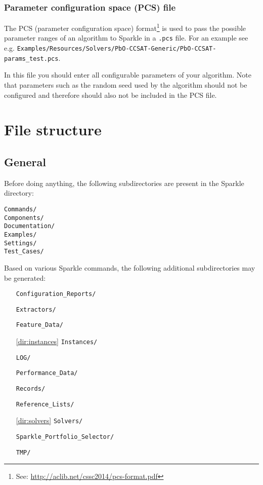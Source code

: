 \documentclass{article}
\begin{document}
\subsubsection{Parameter configuration space (PCS) file}
The PCS (parameter configuration space) format\footnote{See: \url{http://aclib.net/cssc2014/pcs-format.pdf}} is used to pass the possible parameter ranges of an algorithm to Sparkle in a \texttt{.pcs} file. For an example see e.g. \texttt{Examples/Resources/Solvers/PbO-CCSAT-Generic/PbO-CCSAT-params\_test.pcs}.

In this file you should enter all configurable parameters of your algorithm. Note that parameters such as the random seed used by the algorithm should not be configured and therefore should also not be included in the PCS file.

\section{File structure}

\subsection{General}
Before doing anything, the following subdirectories are present in the Sparkle directory:

\begin{verbatim}
Commands/
Components/
Documentation/
Examples/
Settings/
Test_Cases/
\end{verbatim}

Based on various Sparkle commands, the following additional subdirectories may be generated:

\begin{itemize}[noitemsep]
  \item[] \texttt{Configuration\_Reports/}
  \item[] \texttt{Extractors/}
  \item[] \texttt{Feature\_Data/}
  \item[\ref{dir:instances}] \texttt{Instances/}
  \item[] \texttt{LOG/}
  \item[] \texttt{Performance\_Data/}
  \item[] \texttt{Records/}
  \item[] \texttt{Reference\_Lists/}
  \item[\ref{dir:solvers}] \texttt{Solvers/}
  \item[] \texttt{Sparkle\_Portfolio\_Selector/}
  \item[] \texttt{TMP/}
\end{itemize}
\end{document}
